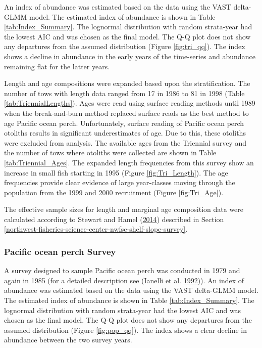 \documentclass[12pt,]{article}
\begin{document}
An index of abundance was estimated based on the data using the VAST
delta-GLMM model. The estimated index of abundance is shown in Table
\ref{tab:Index_Summary}. The lognormal distribution with random
strata-year had the lowest AIC and was chosen as the final model. The
Q-Q plot does not show any departures from the assumed distribution
(Figure \ref{fig:tri_qq}). The index shows a decline in abundance in the
early years of the time-series and abundance remaining flat for the
latter years.

Length and age compositions were expanded based upon the stratification.
The number of tows with length data ranged from 17 in 1986 to 81 in 1998
(Table \ref{tab:TriennialLengths}). Ages were read using surface reading
methods until 1989 when the break-and-burn method replaced surface reads
as the best method to age Pacific ocean perch. Unfortunately, surface
reading of Pacific ocean perch otoliths results in significant
underestimates of age. Due to this, these otoliths were excluded from
analysis. The available ages from the Triennial survey and the number of
tows where otoliths were collected are shown in Table
\ref{tab:Triennial_Ages}. The expanded length frequencies from this
survey show an increase in small fish starting in 1995 (Figure
\ref{fig:Tri_Length}). The age frequencies provide clear evidence of
large year-classes moving through the population from the 1999 and 2000
recruitment (Figure \ref{fig:Tri_Age}).

The effective sample sizes for length and marginal age composition data
were calculated according to Stewart and Hamel
(\protect\hyperlink{ref-stewart_bootstrapping_2014}{2014}) described in
Section
\ref{northwest-fisheries-science-center-nwfsc-shelf-slope-survey}.

\subsubsection{Pacific ocean perch
Survey}\label{pacific-ocean-perch-survey}

A survey designed to sample Pacific ocean perch was conducted in 1979
and again in 1985 (for a detailed description see (Ianelli et al.
\protect\hyperlink{ref-ianelli_status_1992}{1992})). An index of
abundance was estimated based on the data using the VAST delta-GLMM
model. The estimated index of abundance is shown in Table
\ref{tab:Index_Summary}. The lognormal distribution with random
strata-year had the lowest AIC and was chosen as the final model. The
Q-Q plot does not show any departures from the assumed distribution
(Figure \ref{fig:pop_qq}). The index shows a clear decline in abundance
between the two survey years.
\end{document}
